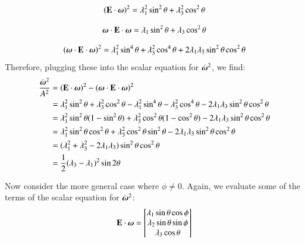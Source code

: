 \documentclass[preprint,12pt,authoryear]{elsarticle}
\newcommand{\mitbf}[1]{\hbox{\mathversion{bold}$#1$}}
\begin{document}
\begin{equation}
\left(\mathbf{E}\cdot \mitbf{\omega}\right)^2 = \lambda_1^2 \sin^2{\theta} + \lambda_3^2 \cos^2{\theta}
\end{equation}

\begin{equation}
\mitbf{\omega} \cdot \mathbf{E} \cdot \mitbf{\omega} = 
\lambda_1 \sin^2{\theta} + \lambda_3 \cos^2{\theta}
\end{equation}

\begin{equation}
\left(\mitbf{\omega} \cdot \mathbf{E} \cdot \mitbf{\omega} \right)^2 =  
\lambda_1^2 \sin^4{\theta} + \lambda_3^2 \cos^4{\theta} + 2 \lambda_1 \lambda_3 \sin^2{\theta} \cos^2{\theta}
\end{equation}
Therefore, plugging these into the scalar equation for $\dot{\mitbf{\omega}}^2$, we find:
\begin{equation}
\begin{aligned}
\frac{\dot{\mitbf{\omega}}^2}{A^2}  &= 
 \left(\mathbf{E}\cdot \mitbf{\omega}\right)^2
 - \left(\mitbf{\omega} \cdot \mathbf{E} \cdot \mitbf{\omega} \right)^2  \\
 &= \lambda_1^2 \sin^2{\theta} + \lambda_3^2 \cos^2{\theta}
 - \lambda_1^2 \sin^4{\theta} - \lambda_3^2 \cos^4{\theta} - 2 \lambda_1 \lambda_3 \sin^2{\theta} \cos^2{\theta} \\
 &= \lambda_1^2 \sin^2{\theta} (1 - \sin^2{\theta}) + \lambda_3^2 \cos^2{\theta} (1 - \cos^2{\theta})
  - 2 \lambda_1 \lambda_3 \sin^2{\theta} \cos^2{\theta} \\
 &= \lambda_1^2 \sin^2{\theta} \cos^2{\theta} + \lambda_3^2 \cos^2{\theta} \sin^2{\theta}
  - 2 \lambda_1 \lambda_3 \sin^2{\theta} \cos^2{\theta} \\
 &= (\lambda_1^2 + \lambda_3^2 - 2 \lambda_1 \lambda_3) \sin^2{\theta} \cos^2{\theta} \\
 &= \frac{1}{2} (\lambda_3 - \lambda_1)^2 \sin{2 \theta} \\
\end{aligned}
\end{equation}

Now consider the more general case where $\phi \ne 0$.
Again, we evaluate some of the terms of the scalar equation for $\dot{\mitbf{\omega}}^2$:
\begin{equation}
\mathbf{E}\cdot \mitbf{\omega} = 
\begin{bmatrix}
\lambda_1 \sin{\theta} \cos{\phi}\\
\lambda_2 \sin{\theta} \sin{\phi} \\
\lambda_3 \cos{\theta}
\end{bmatrix}
\end{equation}
\end{document}
